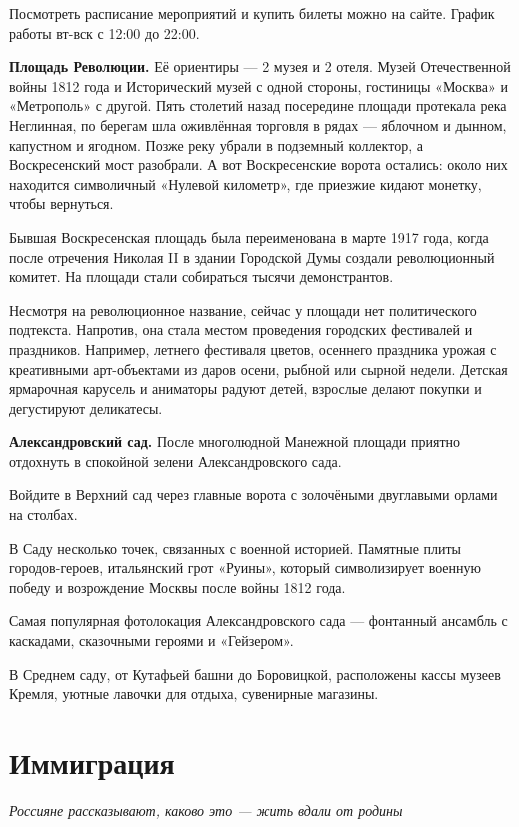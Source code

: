 Посмотреть расписание мероприятий и купить билеты можно на сайте. График работы вт-вск с 12:00 до 22:00.

\textbf{Площадь Революции.} Её ориентиры — 2 музея и 2 отеля. Музей Отечественной войны 1812 года и Исторический музей с одной стороны, гостиницы «Москва» и «Метрополь» с другой. Пять столетий назад посередине площади протекала река Неглинная, по берегам шла оживлённая торговля в рядах — яблочном и дынном, капустном и ягодном. Позже реку убрали в подземный коллектор, а Воскресенский мост разобрали. А вот Воскресенские ворота остались: около них находится символичный «Нулевой километр», где приезжие кидают монетку, чтобы вернуться.

Бывшая Воскресенская площадь была переименована в марте 1917 года, когда после отречения Николая II в здании Городской Думы создали революционный комитет. На площади стали собираться тысячи демонстрантов.


Несмотря на революционное название, сейчас у площади нет политического подтекста. Напротив, она стала местом проведения городских фестивалей и праздников. Например, летнего фестиваля цветов, осеннего праздника урожая с креативными арт-объектами из даров осени, рыбной или сырной недели. Детская ярмарочная карусель и аниматоры радуют детей, взрослые делают покупки и дегустируют деликатесы.

\textbf{Александровский сад.} После многолюдной Манежной площади приятно отдохнуть в спокойной зелени Александровского сада.

Войдите в Верхний сад через главные ворота с золочёными двуглавыми орлами на столбах.


В Саду несколько точек, связанных с военной историей. Памятные плиты городов-героев, итальянский грот «Руины», который символизирует военную победу и возрождение Москвы после войны 1812 года.

Самая популярная фотолокация Александровского сада — фонтанный ансамбль с каскадами, сказочными героями и «Гейзером».

В Среднем саду, от Кутафьей башни до Боровицкой, расположены кассы музеев Кремля, уютные лавочки для отдыха, сувенирные магазины.


\clearpage

\section{Иммиграция}

\textit{Россияне рассказывают, каково это — жить вдали от родины}

